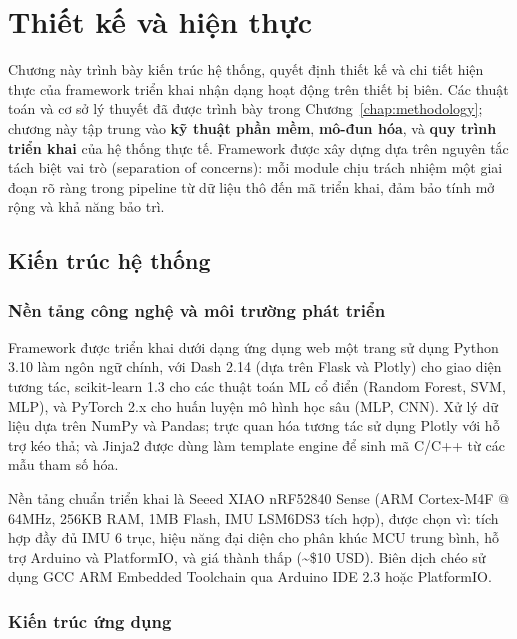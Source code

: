 \chapter{Thiết kế và hiện thực}
\label{chap:design_implementation}

Chương này trình bày kiến trúc hệ thống, quyết định thiết kế và chi tiết hiện thực của framework triển khai nhận dạng hoạt động trên thiết bị biên. Các thuật toán và cơ sở lý thuyết đã được trình bày trong Chương~\ref{chap:methodology}; chương này tập trung vào \textbf{kỹ thuật phần mềm}, \textbf{mô-đun hóa}, và \textbf{quy trình triển khai} của hệ thống thực tế. Framework được xây dựng dựa trên nguyên tắc tách biệt vai trò (separation of concerns): mỗi module chịu trách nhiệm một giai đoạn rõ ràng trong pipeline từ dữ liệu thô đến mã triển khai, đảm bảo tính mở rộng và khả năng bảo trì.

\section{Kiến trúc hệ thống}
\label{sec:system_architecture}

\subsection{Nền tảng công nghệ và môi trường phát triển}
\label{subsec:tech_stack}

Framework được triển khai dưới dạng ứng dụng web một trang sử dụng Python 3.10 làm ngôn ngữ chính, với Dash 2.14 (dựa trên Flask và Plotly) cho giao diện tương tác, scikit-learn 1.3 cho các thuật toán ML cổ điển (Random Forest, SVM, MLP), và PyTorch 2.x cho huấn luyện mô hình học sâu (MLP, CNN). Xử lý dữ liệu dựa trên NumPy và Pandas; trực quan hóa tương tác sử dụng Plotly với hỗ trợ kéo thả; và Jinja2 được dùng làm template engine để sinh mã C/C++ từ các mẫu tham số hóa.

Nền tảng chuẩn triển khai là Seeed XIAO nRF52840 Sense (ARM Cortex-M4F @ 64MHz, 256KB RAM, 1MB Flash, IMU LSM6DS3 tích hợp), được chọn vì: tích hợp đầy đủ IMU 6 trục, hiệu năng đại diện cho phân khúc MCU trung bình, hỗ trợ Arduino và PlatformIO, và giá thành thấp (\textasciitilde\$10 USD). Biên dịch chéo sử dụng GCC ARM Embedded Toolchain qua Arduino IDE 2.3 hoặc PlatformIO.

\subsection{Kiến trúc ứng dụng}
\label{subsec:app_architecture}

